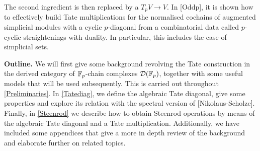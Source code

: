 The second ingredient is then replaced by a  \(T_pV\to V\).
In [Oddp], it is shown how to effectively build Tate multiplications for the normalised cochains of augmented simplicial modules with a cyclic \(p\)-diagonal from a combinatorial data called \(p\)-cyclic straightenings with duality.
In particular, this includes the case of simplicial sets.

{\bf Outline.} We will first give some background revolving the Tate construction in the derived category of \({\mathbb{F}_p}\)-chain complexes \(\mathcal{D}({\mathbb{F}_p})\), together with some useful models that will be used subsequently.
This is carried out throughout \cref{Preliminaries}.
In \cref{Tatediag}, we define the algebraic Tate diagonal, give some properties and explore its relation with the spectral version of [Nikolaus-Scholze].
Finally, in \cref{Steenrod} we describe how to obtain Steenrod operations by means of the algebraic Tate diagonal and a Tate multiplication. %
Additionally, we have included some appendices that give a more in depth review of the background and elaborate further on related topics.
